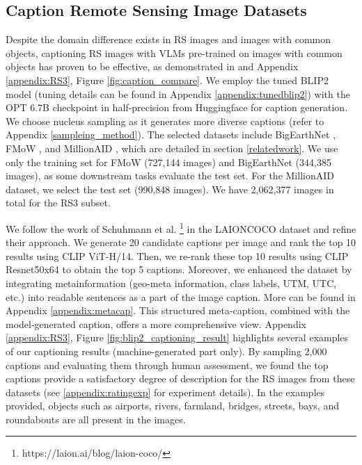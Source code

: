 \documentclass[journal]{IEEEtran}
\begin{document}
\subsection{Caption Remote Sensing Image Datasets}
\label{rs3}

Despite the domain difference exists in RS images and images with common objects, captioning RS images with VLMs pre-trained on images with common objects has proven to be effective, as demonstrated in \cite{blip} and Appendix \ref{appendix:RS3}, Figure \ref{fig:caption_compare}. We employ the tuned BLIP2 model (tuning details can be found in Appendix \ref{appendix:tunedblip2})  \cite{blip2} with the OPT 6.7B checkpoint in half-precision from Huggingface for caption generation. We choose nucleus sampling as it generates more diverse captions (refer to Appendix \ref{sampleing_method}). The selected datasets include BigEarthNet \cite{bigearthnet}, FMoW \cite{fmow}, and MillionAID \cite{millionaid}, which are detailed in section \ref{relatedwork}. We use only the training set for FMoW (727,144 images) and BigEarthNet (344,385 images), as some downstream tasks evaluate the test set. For the MillionAID dataset, we select the test set (990,848 images). We have 2,062,377 images in total for the RS3 subset.

We follow the work of Schuhmann et al. \footnote{https://laion.ai/blog/laion-coco/} in the LAIONCOCO dataset and refine their approach. We generate 20 candidate captions per image and rank the top 10 results using CLIP ViT-H/14. Then, we re-rank these top 10 results using CLIP Resnet50x64 to obtain the top 5 captions. Moreover, we enhanced the dataset by integrating metainformation (geo-meta information, class labels, UTM, UTC, etc.) into readable sentences as a part of the image caption. More can be found in Appendix \ref{appendix:metacap}. This structured meta-caption, combined with the model-generated caption, offers a more comprehensive view. Appendix \ref{appendix:RS3}, Figure \ref{fig:blip2_captioning_result} highlights several examples of our captioning results (machine-generated part only). By sampling 2,000 captions and evaluating them through human assessment, we found the top captions provide a satisfactory degree of description for the RS images from these datasets (see \ref{appendix:ratingexp} for experiment details). In the examples provided, objects such as airports, rivers, farmland, bridges, streets, bays, and roundabouts are all present in the images. 
\end{document}
